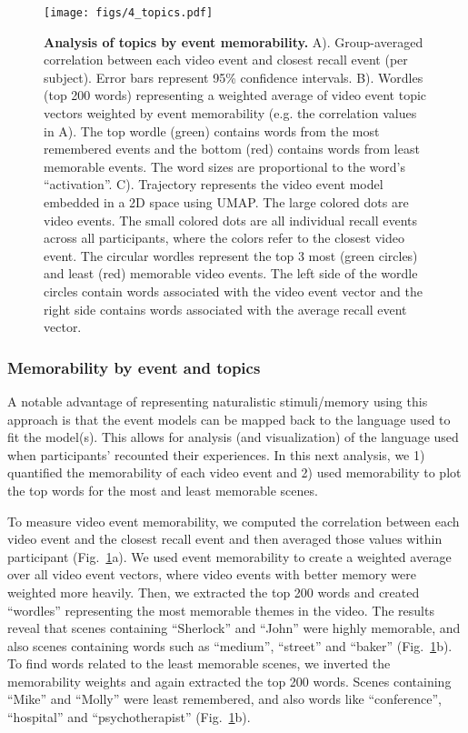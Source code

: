 \documentclass{article}
\begin{document}
{\begin{figure}[t!]
\centering
\texttt{[image: figs/4\_topics.pdf]}
\caption{\small \textbf{Analysis of topics by event memorability.} A). Group-averaged correlation between each video event and closest recall event (per subject). Error bars represent 95\% confidence intervals. B). Wordles (top 200 words) representing a weighted average of video event topic vectors weighted by event memorability (e.g. the correlation values in A). The top wordle (green) contains words from the most remembered events and the bottom (red) contains words from least memorable events. The word sizes are proportional to the word's ``activation''. C). Trajectory represents the video event model embedded in a 2D space using UMAP. The large colored dots are video events. The small colored dots are all individual recall events across all participants, where the colors refer to the closest video event. The circular wordles represent the top 3 most (green circles) and least (red) memorable video events.  The left side of the wordle circles contain words associated with the video event vector and the right side contains words associated with the average recall event vector.}
\label{fig:topics}
\end{figure}

\subsubsection{Memorability by event and topics}
A notable advantage of representing naturalistic stimuli/memory using this approach is that the event models can be mapped back to the language used to fit the model(s).  This allows for analysis (and visualization) of the language used when participants' recounted their experiences.  In this next analysis, we 1) quantified the memorability of each video event and 2) used memorability to plot the top words for the most and least memorable scenes.

To measure video event memorability, we computed the correlation between each video event and the closest recall event and then averaged those values within participant (Fig.~\ref{fig:topics}a). We used event memorability to create a weighted average over all video event vectors, where video events with better memory were weighted more heavily. Then, we extracted the top 200 words and created ``wordles'' representing the most memorable themes in the video. The results reveal that scenes containing ``Sherlock'' and ``John'' were highly memorable, and also scenes containing words such as ``medium'', ``street'' and ``baker'' (Fig.~\ref{fig:topics}b). To find words related to the least memorable scenes, we inverted the memorability weights and again extracted the top 200 words.  Scenes containing ``Mike'' and ``Molly'' were least remembered, and also words like ``conference'', ``hospital'' and ``psychotherapist'' (Fig.~\ref{fig:topics}b).

}
\end{document}
